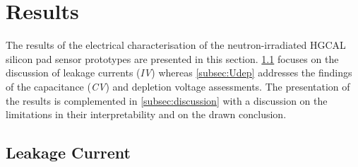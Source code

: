 \section{Results}
\label{sec:results}
The results of the electrical characterisation of the neutron-irradiated HGCAL silicon pad sensor prototypes are presented in this section. 
\ref{subsec:leakagecurrents} focuses on the discussion of leakage currents (\emph{IV}) whereas \ref{subsec:Udep} addresses the findings of the capacitance (\emph{CV}) and depletion voltage assessments. 
The presentation of the results is complemented in \ref{subsec:discussion} with a discussion on the limitations in their interpretability and on the drawn conclusion.

\subsection{Leakage Current}
\label{subsec:leakagecurrents}

